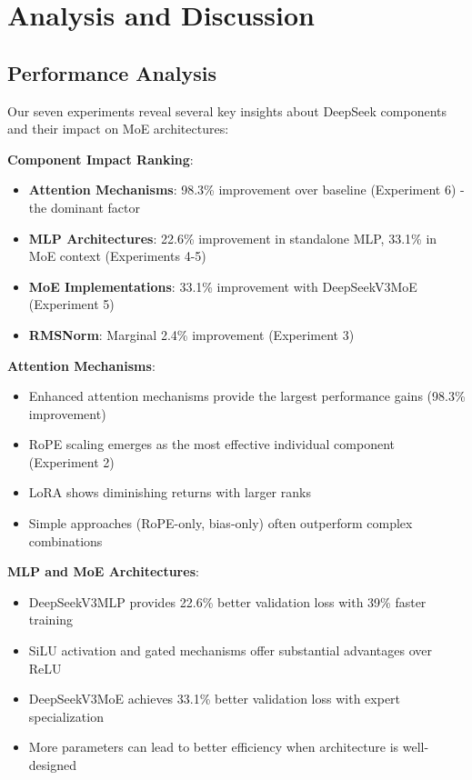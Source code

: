 \documentclass[11pt,a4paper]{article}
\begin{document}
\section{Analysis and Discussion}

\subsection{Performance Analysis}

Our seven experiments reveal several key insights about DeepSeek components and their impact on MoE architectures:

\textbf{Component Impact Ranking}:
\begin{itemize}
    \item \textbf{Attention Mechanisms}: 98.3\% improvement over baseline (Experiment 6) - the dominant factor
    \item \textbf{MLP Architectures}: 22.6\% improvement in standalone MLP, 33.1\% in MoE context (Experiments 4-5)
    \item \textbf{MoE Implementations}: 33.1\% improvement with DeepSeekV3MoE (Experiment 5)
    \item \textbf{RMSNorm}: Marginal 2.4\% improvement (Experiment 3)
\end{itemize}

\textbf{Attention Mechanisms}:
\begin{itemize}
    \item Enhanced attention mechanisms provide the largest performance gains (98.3\% improvement)
    \item RoPE scaling emerges as the most effective individual component (Experiment 2)
    \item LoRA shows diminishing returns with larger ranks
    \item Simple approaches (RoPE-only, bias-only) often outperform complex combinations
\end{itemize}

\textbf{MLP and MoE Architectures}:
\begin{itemize}
    \item DeepSeekV3MLP provides 22.6\% better validation loss with 39\% faster training
    \item SiLU activation and gated mechanisms offer substantial advantages over ReLU
    \item DeepSeekV3MoE achieves 33.1\% better validation loss with expert specialization
    \item More parameters can lead to better efficiency when architecture is well-designed
\end{itemize}
\end{document}

